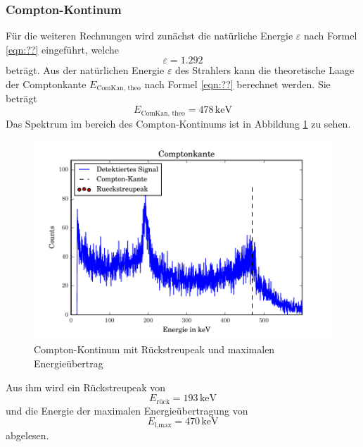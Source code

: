 \subsubsection{Compton-Kontinum}
Für die weiteren Rechnungen wird zunächst die natürliche Energie $\varepsilon$ nach Formel \ref{eqn:??} eingeführt, welche 
\begin{equation}
  \varepsilon = 1.292 
  \label{eqn:nE}
\end{equation}
beträgt. Aus der natürlichen Energie $\varepsilon$ des Strahlers kann die theoretische Laage der Comptonkante $E_\text{ComKan, theo}$ nach Formel \ref{eqn:??} berechnet werden. Sie beträgt
\begin{equation}
  E_\text{ComKan, theo} = 478 \, \text{keV}
  \label{eqn:KanTheo}
\end{equation} 
Das Spektrum im bereich des Compton-Kontinums ist in Abbildung \ref{fig:Compt} zu sehen.
\begin{figure}
  \centering
  \includegraphics[width=\textwidth]{./build/Compton.pdf}
  \caption{Compton-Kontinum mit Rückstreupeak und maximalen Energieübertrag}
  \label{fig:Compt}
\end{figure}
Aus ihm wird ein Rückstreupeak von 
\begin{equation}
  E_\text{rück} = 193 \, \text{keV}
  \label{eqn:KanExp}
\end{equation}
und die Energie der maximalen Energieübertragung von 
\begin{equation}
  E_\text{l,max} = 470 \, \text{keV}
  \label{eqn:RückExp}
\end{equation} 
abgelesen. 
